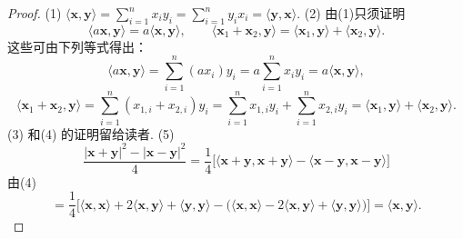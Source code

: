 \begin{proof}
    (1) $\langle\mathbf{x},\mathbf{y}\rangle=\sum_{i=1}^n x_i y_i=\sum_{i=1}^n y_i x_i=\langle\mathbf{y},\mathbf{x}\rangle$.
    (2) 由(1)只须证明
    $$\langle a\mathbf{x},\mathbf{y}\rangle=a\langle\mathbf{x},\mathbf{y}\rangle,\qquad
    \langle\mathbf{x}_1+\mathbf{x}_2,\mathbf{y}\rangle=\langle\mathbf{x}_1,\mathbf{y}\rangle+\langle\mathbf{x}_2,\mathbf{y}\rangle.$$
    这些可由下列等式得出：
    $$\langle a\mathbf{x},\mathbf{y}\rangle=\sum_{i=1}^n(a x_i)y_i=a\sum_{i=1}^n x_i y_i=a\langle\mathbf{x},\mathbf{y}\rangle,$$
    $$\langle\mathbf{x}_1+\mathbf{x}_2,\mathbf{y}\rangle=\sum_{i=1}^n(x_{1,i}+x_{2,i})y_i
    =\sum_{i=1}^n x_{1,i}y_i+\sum_{i=1}^n x_{2,i}y_i
    =\langle\mathbf{x}_1,\mathbf{y}\rangle+\langle\mathbf{x}_2,\mathbf{y}\rangle.$$
    (3) 和(4) 的证明留给读者.
    (5)
    $$\frac{|\mathbf{x}+\mathbf{y}|^2-|\mathbf{x}-\mathbf{y}|^2}{4}
    =\frac{1}{4}\bigl[\langle\mathbf{x}+\mathbf{y},\mathbf{x}+\mathbf{y}\rangle-\langle\mathbf{x}-\mathbf{y},\mathbf{x}-\mathbf{y}\rangle\bigr]$$由(4)
    $$=\frac{1}{4}\bigl[\langle\mathbf{x},\mathbf{x}\rangle+2\langle\mathbf{x},\mathbf{y}\rangle+\langle\mathbf{y},\mathbf{y}\rangle
    -\bigl(\langle\mathbf{x},\mathbf{x}\rangle-2\langle\mathbf{x},\mathbf{y}\rangle+\langle\mathbf{y},\mathbf{y}\rangle\bigr)\bigr]
    =\langle\mathbf{x},\mathbf{y}\rangle.$$
\end{proof}
